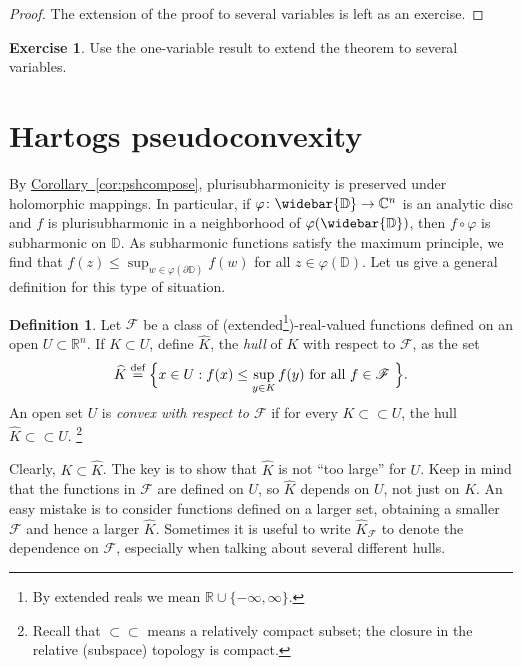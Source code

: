 \documentclass[12pt,openany]{book}
\newcommand{\C}{{\mathbb{C}}}
\newcommand{\R}{{\mathbb{R}}}
\newcommand{\D}{{\mathbb{D}}}
\newcommand{\sF}{{\mathscr{F}}}
\newcommand{\myindex}[1]{#1\index{#1}}
\theoremstyle{plain}
\theoremstyle{remark}
\theoremstyle{definition}
\newtheorem{defn}[thm]{Definition}
\newenvironment{exbox}{%
    \def\FrameCommand{\vrule width 1pt \relax\hspace{10pt}}%
    \MakeFramed{\advance\hsize-\width\FrameRestore}%
}{%
    \endMakeFramed
}
\theoremstyle{exercise}
\newtheorem{exercise}{Exercise}[section]
\theoremstyle{example}
\newcommand{\corref}[1]{\hyperref[#1]{Corollary~\ref*{#1}}}
\begin{document}
\begin{proof}
The extension of the proof to several variables is left as an exercise.
\end{proof}

\begin{exbox}
\begin{exercise}
Use the one-variable result to extend the theorem to several variables.
\end{exercise}
\end{exbox}


\section{Hartogs pseudoconvexity}

By \corref{cor:pshcompose},
plurisubharmonicity is preserved under holomorphic mappings.
In particular, if $\varphi \colon \widebar{\D} \to
\C^n$ is an analytic disc and $f$ is plurisubharmonic in a neighborhood of
$\varphi(\widebar{\D})$, then $f \circ \varphi$ is subharmonic on $\D$.
As subharmonic functions satisfy the maximum principle, we find
that $f(z) \leq \sup_{w \in \varphi(\partial \D)} f(w)$ for
all $z \in \varphi(\D)$.  Let us give a general definition
for this type of situation.

\begin{defn}
Let $\sF$ be a class of (extended\footnote{%
By extended reals we mean $\R \cup \{ -\infty,\infty\}$.})-real-valued
functions defined on an open $U \subset \R^n$.  If $K
\subset U$, define $\widehat{K}$, the \emph{\myindex{hull}} of $K$ with
respect to $\sF$, as the set
%
\begin{equation*}
\widehat{K} \overset{\text{def}}{=} \Bigl\{ x \in U : f(x) \leq \sup_{y\in K} f(y)
\text{ for all $f \in \sF$ } \Bigr\} .
\end{equation*}
An open set $U$ is \emph{convex with respect to $\sF$}\index{convex!with respect to $\sF$}
if for every $K \subset \subset U$, the hull $\widehat{K} \subset \subset U$.%
\footnote{Recall that $\subset \subset$ means a relatively
compact subset;
the closure in the relative (subspace) topology is compact.}
\end{defn}

Clearly, $K \subset \widehat{K}$.  The key is to show that $\widehat{K}$
is not ``too large'' for $U$.
Keep in mind that the functions in $\sF$ are defined on $U$, so $\widehat{K}$
depends on $U$, not just on $K$.  An easy mistake is to consider functions defined
on a larger set, obtaining a smaller $\sF$ and hence a larger
$\widehat{K}$.  Sometimes it is useful to write $\widehat{K}_{\sF}$ to
denote the dependence on $\sF$, especially when talking about several different
hulls.
\end{document}

